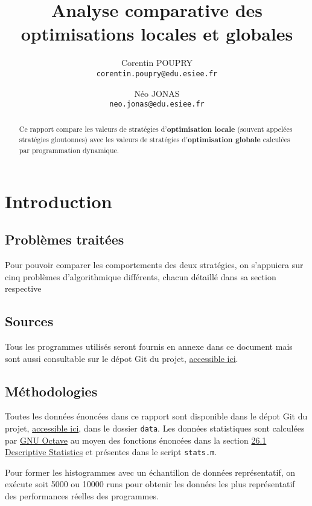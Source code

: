 \documentclass[a4paper,english,french]{article}
\title{Analyse comparative des optimisations locales et globales}
\date{}
\author{
  Corentin POUPRY\\
  \texttt{corentin.poupry@edu.esiee.fr}
  \and
  Néo JONAS\\
  \texttt{neo.jonas@edu.esiee.fr}
}
\begin{document}
\maketitle

\begin{abstract}
    Ce rapport compare les valeurs de stratégies d'\textbf{optimisation locale} (souvent appelées stratégies gloutonnes) avec les valeurs de stratégies d'\textbf{optimisation globale} calculées par programmation dynamique.
\end{abstract}

\section*{Introduction}

\subsection*{Problèmes traitées}

Pour pouvoir comparer les comportements des deux stratégies, on s'appuiera sur cinq problèmes d'algorithmique différents, chacun détaillé dans sa section respective

\tableofcontents

\subsection*{Sources}

Tous les programmes utilisés seront fournis en annexe dans ce document mais sont aussi consultable sur le dépot Git du projet, \href{https://github.com/HelloEdit/igi-2102}{accessible ici}.

\subsection*{Méthodologies}

Toutes les données énoncées dans ce rapport sont disponible dans le dépot Git du projet, \href{https://github.com/HelloEdit/igi-2102}{accessible ici}, dans le dossier \texttt{data}. Les données statistiques sont calculées par \href{https://www.gnu.org/software/octave/index}{GNU Octave} au moyen des fonctions énoncées dans la section \href{https://octave.org/doc/v4.0.1/Descriptive-Statistics.html}{26.1 Descriptive Statistics} et présentes dans le script \texttt{stats.m}.

Pour former les histogrammes avec un échantillon de données représentatif, on exécute soit 5000 ou 10000 runs pour obtenir les données les plus représentatif des performances réelles des programmes.
\end{document}
